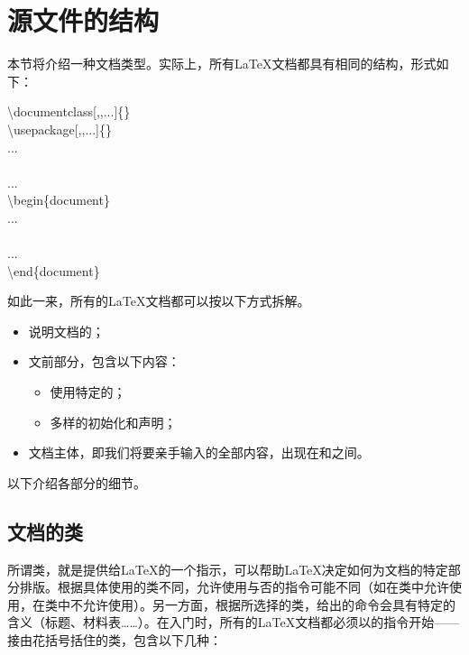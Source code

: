\section{源文件的结构}

本节将介绍一种文档类型。实际上，所有\LaTeX 文档都具有相同的结构，形式如下：

\begin{dmd}
\backslash documentclass[,,...]\{\}\\
\backslash usepackage[,,...]\{\}\\
...\\
\\
...\\
\backslash begin\{document\}\\
...\\
\\
...\\
\backslash end\{document\}
\end{dmd}

如此一来，所有的\LaTeX 文档都可以按以下方式拆解。

\begin{itemize}
    \item 说明文档的；
    \item 文前部分，包含以下内容：
        \begin{itemize}
            \item 使用特定的；
            \item 多样的初始化和声明；
        \end{itemize}
    \item 文档主体，即我们将要亲手输入的全部内容，出现在和之间。
\end{itemize}

以下介绍各部分的细节。

\subsection{文档的类}

所谓类，就是提供给\LaTeX 的一个指示，可以帮助\LaTeX 决定如何为文档的特定部分排版。根据具体使用的类不同，允许使用与否的指令可能不同（如在类中允许使用，在类中不允许使用）。另一方面，根据所选择的类，给出的命令会具有特定的含义（标题、材料表……）。在入门时，所有的\LaTeX 文档都必须以的指令开始——接由花括号括住的类，包含以下几种：

